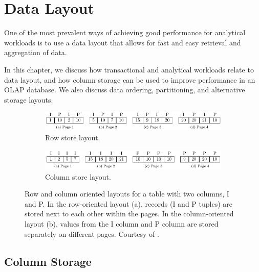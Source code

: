 \chapter{Data Layout}
\label{chap:Data Layout}
One of the most prevalent ways of achieving good performance for analytical workloads is to use a data layout that allows for fast and easy retrieval and aggregation of data.

In this chapter, we discuss how transactional and analytical workloads relate to data layout, and how column storage can be used to improve performance in an OLAP database. We also discuss data ordering, partitioning, and alternative storage layouts.
\newpage

\begin{figure}
  \centering
  \begin{subfigure}{\textwidth}
    \includegraphics[width=\textwidth]{img/row-store.png}
    \caption{Row store layout.}
    \label{fig:row-column-store-1} 
  \end{subfigure}
  \begin{subfigure}{\textwidth}
    \includegraphics[width=\textwidth]{img/column-store.png}
    \caption{Column store layout.}
    \label{fig:row-column-store-2} 
  \end{subfigure}
  \caption{Row and column oriented layouts for a table with two columns, I and P. In the row-oriented layout (a), records (I and P tuples) are stored next to each other within the pages. In the column-oriented layout (b), values from the I column and P column are stored separately on different pages. Courtesy of \cite{Bjorklund2011-wh}.}
  \label{fig:row-column-store} 
\end{figure}
\section{Column Storage}
\label{sec:Column Storage}


